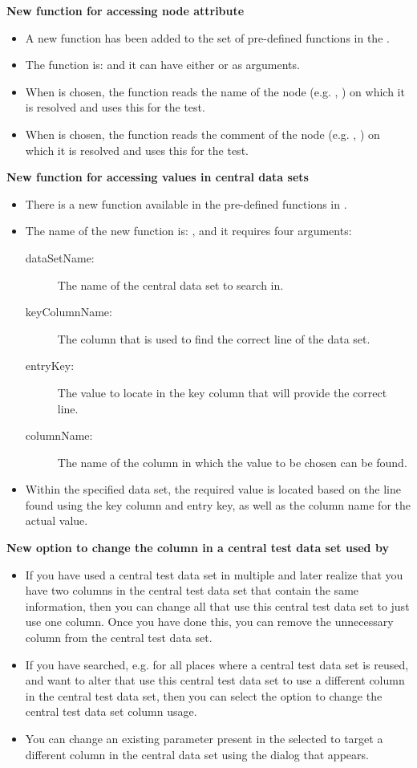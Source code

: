 \textbf{New function for accessing node attribute}
\begin{itemize}
\item A new function has been added to the set of pre-defined functions in the \ite{}.
\item The function is:  and it can have either  or  as arguments.
\item When  is chosen, the function reads the name of the node (e.g. \gdcase{}, \gdstep{}) on which it is resolved and uses this for the test.
\item  When  is chosen, the function reads the comment of the node (e.g. \gdcase{}, \gdstep{}) on which it is resolved and uses this for the test.
\end{itemize}

\textbf{New function for accessing values in central data sets}
\begin{itemize}
\item There is a new function available in the pre-defined functions in \app{}.
\item The name of the new function is: , and it requires four arguments:
\begin{description}
\item [dataSetName:]{The name of the central data set to search in.}
\item [keyColumnName:]{The column that is used to find the correct line of the data set.}
\item [entryKey:]{The value to locate in the key column that will provide the correct line.}
\item [columnName:]{The name of the column in which the value to be chosen can be found.}
\end{description}
\item Within the specified data set, the required value is located based on the line found using the key column and entry key, as well as the column name for the actual value. 
\end{itemize}

\textbf{New option to change the column in a central test data set used by \gdcases{}}
\begin{itemize} 
\item If you have used a central test data set in multiple \gdcases{} and later realize that you have two columns in the central test data set that contain the same information, then you can change all \gdcases{} that use this central test data set to just use one column. Once you have done this, you can remove the unnecessary column from the central test data set.   
\item If you have searched, e.g. for all places where a central test data set is reused, and want to alter \gdcases{} that use this central test data set to use a different column in the central test data set, then you can select the option to change the central test data set column usage.
\item You can change an existing parameter present in the selected \gdcases{} to target a different column in the central data set using the dialog that appears.  
\end{itemize}


